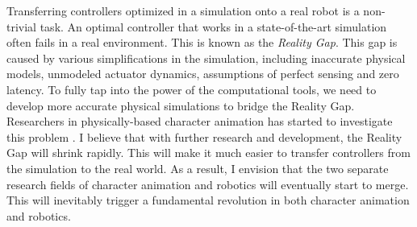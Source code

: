 Transferring controllers optimized in a simulation onto a real robot is a non-trivial task. An optimal controller that works in a state-of-the-art simulation often fails in a real environment. This is known as the \emph{Reality Gap}. This gap is caused by various simplifications in the simulation, including inaccurate physical models, unmodeled actuator dynamics, assumptions of perfect sensing and zero latency. To fully tap into the power of the computational tools, we need to develop more accurate physical simulations to bridge the Reality Gap. Researchers in physically-based character animation has started to investigate this problem \cite{Bharaj:2015,Megaro:2015}. I believe that with further research and development, the Reality Gap will shrink rapidly. This will make it much easier to transfer controllers from the simulation to the real world. As a result, I envision that the two separate research fields of character animation and robotics will eventually start to merge. This will inevitably trigger a fundamental revolution in both character animation and robotics.


